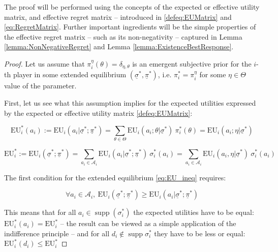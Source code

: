 \documentclass{article}
\theoremstyle{definition}
\DeclareMathOperator\supp{supp}
\begin{document}
The proof will be performed using the concepts of the expected or effective utility matrix, and effective regret matrix -- introduced in \eqref{defeq:EUMatrix} and \eqref{eq:RegretMatrix}.
Further important ingredients will be the simple properties of the effective regret matrix -- such as its non-negativity -- captured in Lemma \autoref{lemma:NonNegativeRegret} and Lemma \autoref{lemma:ExistenceBestResponse}.

\begin{proof}
    
    
    Let us assume that $\pi^\eta_i(\theta) = \delta_{\eta,\theta}$ is an emergent subjective prior for the $i$-th player in some extended equilibrium $(\underline{\sigma}^*,\underline{\pi}^*)$, i.e. $\pi_i^* = \pi^\eta_i$ for some $\eta \in \Theta$ value of the parameter.

    First, let us see what this assumption implies for the expected utilities expressed by the expected or effective utility matrix \eqref{defeq:EUMatrix}:

    \begin{equation}
        \mathrm{EU}_i^*(a_i) := \mathrm{EU}_i(a_i | \underline{\sigma}^*;\underline{\pi}^*) =
        \sum_{\theta \in \Theta} \mathrm{EU}_i(a_i;\theta | \underline{\sigma}^*) \ \pi_i^*(\theta) =
        \mathrm{EU}_i(a_i;\eta | \underline{\sigma}^*)
    \end{equation}

    \begin{equation}
        \mathrm{EU}_i^* := \mathrm{EU}_i(\underline{\sigma}^*;\underline{\pi}^*) =
        \sum_{a_i \in \mathcal{A}_i} \mathrm{EU}_i(a_i | \underline{\sigma}^*;\underline{\pi}^*) \ \sigma_i^* (a_i)
        =
        \sum_{a_i \in \mathcal{A}_i} \mathrm{EU}_i(a_i,\eta | \underline{\sigma}^*) \ \sigma_i^* (a_i)
    \end{equation}

    The first condition for the extended equilibrium \eqref{eq:EU_ineq} requires:

    \begin{equation}
        \forall a_i \in \mathcal{A}_i, \  \mathrm{EU}_i(\underline{\sigma}^*;\underline{\pi}^*) \ge \mathrm{EU}_i(a_i | \underline{\sigma}^*;\underline{\pi}^*)
    \end{equation}

    This means that for all $a_i \in \supp(\sigma_i^*)$ the expected utilities have to be equal: $\mathrm{EU}_i^*(a_i) = \mathrm{EU}_i^*$ -- the result can be viewed as a simple application of the indifference principle \cite{book:GameTheory}
    -- and for all $d_i \notin \supp{\sigma_i^*}$ they have to be less or equal: $\mathrm{EU}_i^*(d_i) \le \mathrm{EU}_i^*$


\end{proof}
\end{document}
